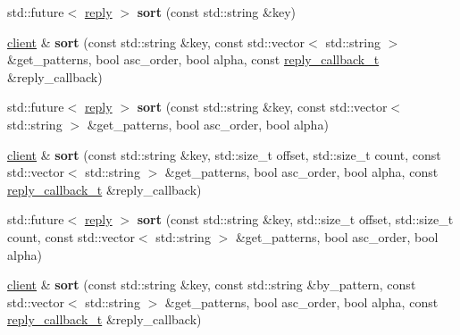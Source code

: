 \begin{DoxyCompactItemize}
\item 
\mbox{\label{classcpp__redis_1_1client_a26bd487087d47a9615092c5c6576fa0f}} 
std\+::future$<$ \hyperlink{classcpp__redis_1_1reply}{reply} $>$ {\bfseries sort} (const std\+::string \&key)
\item 
\mbox{\label{classcpp__redis_1_1client_a666fb5c341064c63294db7b51c51d628}} 
\hyperlink{classcpp__redis_1_1client}{client} \& {\bfseries sort} (const std\+::string \&key, const std\+::vector$<$ std\+::string $>$ \&get\+\_\+patterns, bool asc\+\_\+order, bool alpha, const \hyperlink{classcpp__redis_1_1client_a061a1140d36d2eaeda82b09a0bb3f9f2}{reply\+\_\+callback\+\_\+t} \&reply\+\_\+callback)
\item 
\mbox{\label{classcpp__redis_1_1client_a8d17e0ded525626a3bc077eb3b98bc52}} 
std\+::future$<$ \hyperlink{classcpp__redis_1_1reply}{reply} $>$ {\bfseries sort} (const std\+::string \&key, const std\+::vector$<$ std\+::string $>$ \&get\+\_\+patterns, bool asc\+\_\+order, bool alpha)
\item 
\mbox{\label{classcpp__redis_1_1client_a11a3ac7152396069a04fa71ff2df587c}} 
\hyperlink{classcpp__redis_1_1client}{client} \& {\bfseries sort} (const std\+::string \&key, std\+::size\+\_\+t offset, std\+::size\+\_\+t count, const std\+::vector$<$ std\+::string $>$ \&get\+\_\+patterns, bool asc\+\_\+order, bool alpha, const \hyperlink{classcpp__redis_1_1client_a061a1140d36d2eaeda82b09a0bb3f9f2}{reply\+\_\+callback\+\_\+t} \&reply\+\_\+callback)
\item 
\mbox{\label{classcpp__redis_1_1client_a0fd0dc2b3201ee204a2154aa4f137791}} 
std\+::future$<$ \hyperlink{classcpp__redis_1_1reply}{reply} $>$ {\bfseries sort} (const std\+::string \&key, std\+::size\+\_\+t offset, std\+::size\+\_\+t count, const std\+::vector$<$ std\+::string $>$ \&get\+\_\+patterns, bool asc\+\_\+order, bool alpha)
\item 
\mbox{\label{classcpp__redis_1_1client_a3a443c007c341db12f3d57a2db041092}} 
\hyperlink{classcpp__redis_1_1client}{client} \& {\bfseries sort} (const std\+::string \&key, const std\+::string \&by\+\_\+pattern, const std\+::vector$<$ std\+::string $>$ \&get\+\_\+patterns, bool asc\+\_\+order, bool alpha, const \hyperlink{classcpp__redis_1_1client_a061a1140d36d2eaeda82b09a0bb3f9f2}{reply\+\_\+callback\+\_\+t} \&reply\+\_\+callback)

\end{DoxyCompactItemize}
